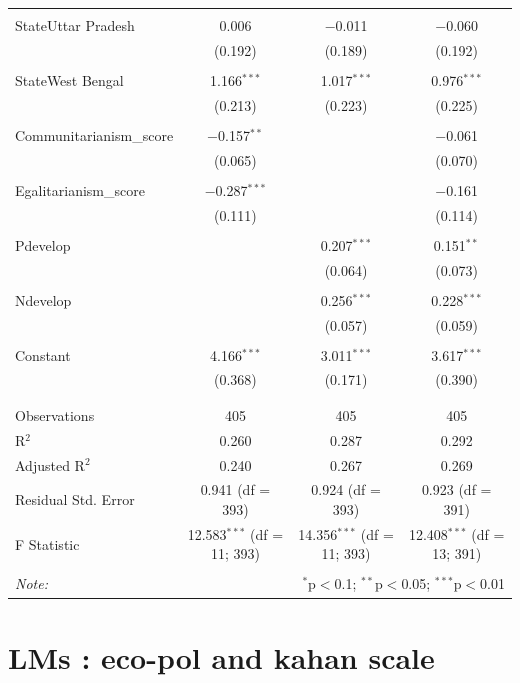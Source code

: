 \documentclass[
]{article}
\begin{document}
\begin{table}[!htbp]
\begin{tabular}{@{\extracolsep{5pt}}lccc}
  & & & \\ 
 StateUttar Pradesh & 0.006 & $-$0.011 & $-$0.060 \\ 
  & (0.192) & (0.189) & (0.192) \\ 
  & & & \\ 
 StateWest Bengal & 1.166$^{***}$ & 1.017$^{***}$ & 0.976$^{***}$ \\ 
  & (0.213) & (0.223) & (0.225) \\ 
  & & & \\ 
 Communitarianism\_score & $-$0.157$^{**}$ &  & $-$0.061 \\ 
  & (0.065) &  & (0.070) \\ 
  & & & \\ 
 Egalitarianism\_score & $-$0.287$^{***}$ &  & $-$0.161 \\ 
  & (0.111) &  & (0.114) \\ 
  & & & \\ 
 Pdevelop &  & 0.207$^{***}$ & 0.151$^{**}$ \\ 
  &  & (0.064) & (0.073) \\ 
  & & & \\ 
 Ndevelop &  & 0.256$^{***}$ & 0.228$^{***}$ \\ 
  &  & (0.057) & (0.059) \\ 
  & & & \\ 
 Constant & 4.166$^{***}$ & 3.011$^{***}$ & 3.617$^{***}$ \\ 
  & (0.368) & (0.171) & (0.390) \\ 
  & & & \\ 
\hline \\[-1.8ex] 
Observations & 405 & 405 & 405 \\ 
R$^{2}$ & 0.260 & 0.287 & 0.292 \\ 
Adjusted R$^{2}$ & 0.240 & 0.267 & 0.269 \\ 
Residual Std. Error & 0.941 (df = 393) & 0.924 (df = 393) & 0.923 (df = 391) \\ 
F Statistic & 12.583$^{***}$ (df = 11; 393) & 14.356$^{***}$ (df = 11; 393) & 12.408$^{***}$ (df = 13; 391) \\ 
\hline 
\hline \\[-1.8ex] 
\textit{Note:}  & \multicolumn{3}{r}{$^{*}$p$<$0.1; $^{**}$p$<$0.05; $^{***}$p$<$0.01} \\ 
\end{tabular} 
\end{table} 
\endgroup

\newpage

\hypertarget{lms-eco-pol-and-kahan-scale}{%
\section{LMs : eco-pol and kahan
scale}\label{lms-eco-pol-and-kahan-scale}}
\end{document}
